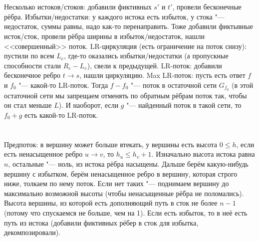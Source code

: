 \section{} %
Несколько истоков/стоков: добавили фиктивных $s'$ и $t'$, провели бесконечные рёбра.
Избытки/недостатки: у каждого истока есть избыток, у стока "--- недостаток, суммы равны, надо как-то перенаправить.
Тоже добавили фиктывные исток/сток, провели рёбра ширины в избыток/недостаток, нашли <<совершенный>> поток.
LR-циркуляция (есть ограничение на поток снизу): пустили по всем $L_e$, где-то оказались избытки/недостатки (а пропускные способности стали $R_e-L_e$), свели к предыдущей.
LR-поток: добавили бесконечное ребро $t \to s$, нашли циркуляцию.
Max LR-поток: пусть есть ответ $f$ и $f_0$ "--- какой-то LR-поток.
Тогда $f-f_0$ "--- поток в остаточной сети $G_{f_0}$ (в этой остаточной сети мы запрещаем отменять по обратным рёбрам поток так, чтобы он стал меньше $L$).
И наоборот, если $g$ "--- найденный поток в такой сети, то $f_0+g$ есть какой-то LR-поток.

\section{} %
Предпоток: в вершину может больше втекать, у вершины есть высота $0 \le h$, если есть ненасыщенное ребро $u \to v$, то $h_u \le h_v + 1$.
Изначально высота истока равна $n$, остальные "--- ноль, из истока рёбра насыщены.
Дальше берём какую-нибудь вершину с избытком, берём ненасыщенное ребро в вершину, которая строго ниже, толкаем по нему поток.
Если нет таких "--- поднимаем вершину до максимально возможной высоты (чтобы ненасыщенные рёбра не поломались).
Высота вершины, из которой есть дополняющий путь в сток не более $n-1$ (потому что спускаемся не больше, чем на 1).
Если есть избыток, то в неё есть путь из истока (добавили фиктивных рёбер в сток для избытка, декомпозировали).
\TODO

\section{} %
\TODO

\section{} %
\TODO

